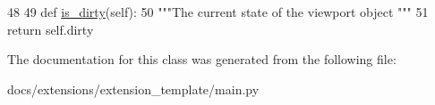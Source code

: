 \begin{DoxyCode}
48 
49     \textcolor{keyword}{def }\hyperlink{classmain_1_1ViewPort_a5652106d953c961d92bf96b32e4130b0}{is\_dirty}(self):
50         \textcolor{stringliteral}{"""The current state of the viewport object """}
51         \textcolor{keywordflow}{return} self.dirty
        
\end{DoxyCode}


The documentation for this class was generated from the following file\+:\begin{DoxyCompactItemize}
\item 
docs/extensions/extension\+\_\+template/main.\+py\end{DoxyCompactItemize}
